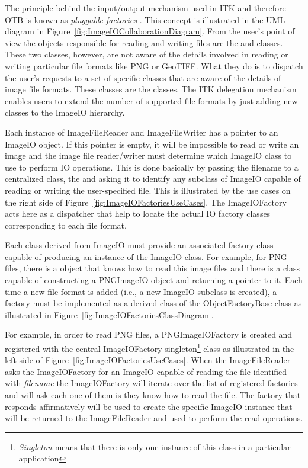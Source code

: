The principle behind the input/output mechanism used in ITK and
therefore OTB is known as
\emph{pluggable-factories} \cite{Gamma1995}. This concept is illustrated in
the UML diagram in Figure~\ref{fig:ImageIOCollaborationDiagram}. From the
user's point of view the objects responsible for reading and writing files
are the  and 
classes. These two classes, however, are not aware of the details involved in
reading or writing particular file formats like PNG or GeoTIFF.  What they do
is to dispatch the user's requests to a set of specific classes that are
aware of the details of image file formats. These classes are the
 classes. The ITK delegation mechanism enables users to
extend the number of supported file formats by just adding new classes to the
ImageIO hierarchy.

Each instance of ImageFileReader and ImageFileWriter has
a pointer to an ImageIO object. If this pointer is empty, it will
be impossible to read or write an image and the image file reader/writer must
determine which ImageIO class to use to perform IO operations.
This is done basically by passing the filename to a centralized class, the
 and asking it to identify any subclass of
ImageIO capable of reading or writing the user-specified file. This
is illustrated by the use cases on the right side of
Figure~\ref{fig:ImageIOFactoriesUseCases}. The ImageIOFactory acts here as a
dispatcher that help to locate the actual IO factory classes corresponding to
each file format.

Each class derived from ImageIO must provide an associated factory
class capable of producing an instance of the ImageIO class. For
example, for PNG files, there is a  object that knows how
to read this image files and there is a  class
capable of constructing a PNGImageIO object and returning a pointer
to it.  Each time a new file format is added (i.e., a new ImageIO
subclass is created), a factory must be implemented as a derived class of the
ObjectFactoryBase class as illustrated in
Figure~\ref{fig:ImageIOFactoriesClassDiagram}.

For example, in order to read PNG files, a PNGImageIOFactory is
created and registered with the central ImageIOFactory
singleton\footnote{\emph{Singleton} means that there is only one instance of
this class in a particular application} class as illustrated in the left side
of Figure~\ref{fig:ImageIOFactoriesUseCases}. When the ImageFileReader asks
the ImageIOFactory for an ImageIO capable of reading the
file identified with \emph{filename} the ImageIOFactory will iterate over the
list of registered factories and will ask each one of them is they know how
to read the file. The factory that responds affirmatively will be used to
create the specific ImageIO instance that will be returned to the
ImageFileReader and used to perform the read operations.

